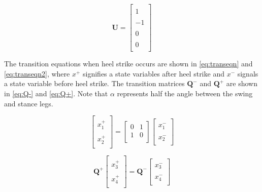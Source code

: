 \documentclass{./springer/svjour3}
\newcommand{\mb}[1]{\mathbf{#1}}
\begin{document}
\begin{equation}
\mb{U} = 
\label{eq:U2}
\begin{bmatrix}
\\1\\
\\-1\\
\\0\\
\\0\\
\end{bmatrix}
\end{equation}



The transition equations when heel strike occurs are shown in \ref{eq:transeqn} and \ref{eq:transeqn2}, where $x^+$ signifies a state variables after heel strike and $x^-$ 
signals a state variable before
heel strike. The transition matrices $\mb{Q^-}$ and $\mb{Q^+}$ are shown in \ref{eq:Q-} and \ref{eq:Q+}. Note that $\alpha$ represents half the angle between the swing and stance 
legs.

\begin{equation}
\label{eq:transeqn}
\begin{bmatrix}
\\x_1^+\\
\\x_2^+\\
\end{bmatrix}
 = 
\begin{bmatrix}
0 & 1\\
1 & 0\\
\end{bmatrix}
\begin{bmatrix}
\\x_1^-\\
\\x_2^-\\
\end{bmatrix}
\end{equation}

\begin{equation}
\label{eq:transeqn2}
\mb{Q^+}
\begin{bmatrix}
\\x_3^+\\
\\x_4^+\\
\end{bmatrix}
= 
\mb{Q^-}
\begin{bmatrix}
\\x_3^-\\
\\x_4^-\\
\end{bmatrix}
\end{equation}
\end{document}
